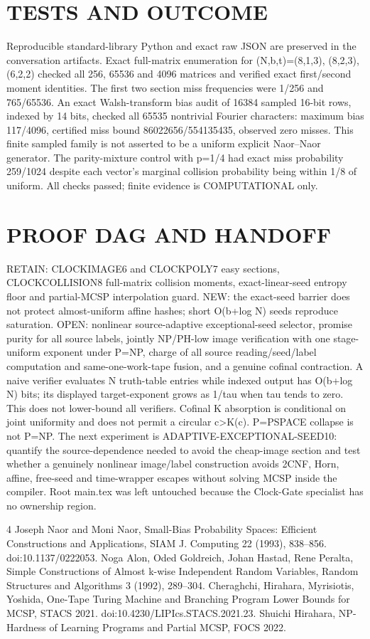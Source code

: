 \documentclass[11pt]{article}
\begin{document}
\section*{TESTS AND OUTCOME}
Reproducible standard-library Python and exact raw JSON are preserved in the conversation artifacts. Exact full-matrix enumeration for (N,b,t)=(8,1,3), (8,2,3), (6,2,2) checked all 256, 65536 and 4096 matrices and verified exact first/second moment identities. The first two section miss frequencies were 1/256 and 765/65536. An exact Walsh-transform bias audit of 16384 sampled 16-bit rows, indexed by 14 bits, checked all 65535 nontrivial Fourier characters: maximum bias 117/4096, certified miss bound 86022656/554135435, observed zero misses. This finite sampled family is not asserted to be a uniform explicit Naor--Naor generator. The parity-mixture control with p=1/4 had exact miss probability 259/1024 despite each vector's marginal collision probability being within 1/8 of uniform. All checks passed; finite evidence is COMPUTATIONAL only.
\section*{PROOF DAG AND HANDOFF}
RETAIN: CLOCKIMAGE6 and CLOCKPOLY7 easy sections, CLOCKCOLLISION8 full-matrix collision moments, exact-linear-seed entropy floor and partial-MCSP interpolation guard. NEW: the exact-seed barrier does not protect almost-uniform affine hashes; short O(b+log N) seeds reproduce saturation. OPEN: nonlinear source-adaptive exceptional-seed selector, promise purity for all source labels, jointly NP/PH-low image verification with one stage-uniform exponent under P=NP, charge of all source reading/seed/label computation and same-one-work-tape fusion, and a genuine cofinal contraction. A naive verifier evaluates N truth-table entries while indexed output has O(b+log N) bits; its displayed target-exponent grows as 1/tau when tau tends to zero. This does not lower-bound all verifiers. Cofinal K absorption is conditional on joint uniformity and does not permit a circular c>K(c). P=PSPACE collapse is not P=NP. The next experiment is ADAPTIVE-EXCEPTIONAL-SEED10: quantify the source-dependence needed to avoid the cheap-image section and test whether a genuinely nonlinear image/label construction avoids 2CNF, Horn, affine, free-seed and time-wrapper escapes without solving MCSP inside the compiler. Root main.tex was left untouched because the Clock-Gate specialist has no ownership region.
\begin{thebibliography}{4}
 Joseph Naor and Moni Naor, Small-Bias Probability Spaces: Efficient Constructions and Applications, SIAM J. Computing 22 (1993), 838--856. doi:10.1137/0222053.
 Noga Alon, Oded Goldreich, Johan Hastad, Rene Peralta, Simple Constructions of Almost k-wise Independent Random Variables, Random Structures and Algorithms 3 (1992), 289--304.
 Cheraghchi, Hirahara, Myrisiotis, Yoshida, One-Tape Turing Machine and Branching Program Lower Bounds for MCSP, STACS 2021. doi:10.4230/LIPIcs.STACS.2021.23.
 Shuichi Hirahara, NP-Hardness of Learning Programs and Partial MCSP, FOCS 2022.
\end{thebibliography}
\end{document}
